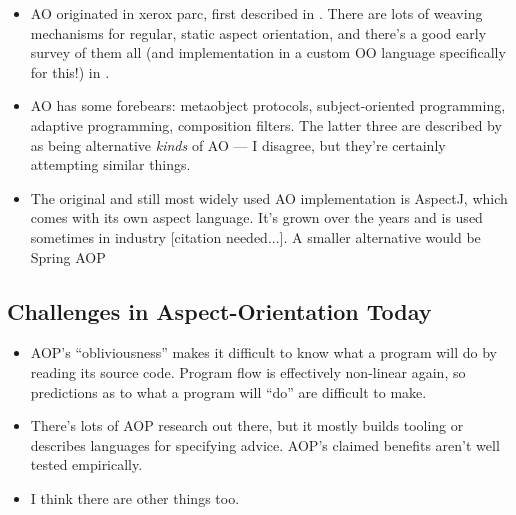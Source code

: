 \begin{itemize}
    \item AO originated in xerox parc, first described in
    \cite{kiczales1997aspect}. There are lots of weaving mechanisms for regular,
    static aspect orientation, and there's a good early survey of them all (and
    implementation in a custom OO language specifically for this!) in
    \cite{masuhara2003modeling}.
    \item AO has some forebears: metaobject protocols, subject-oriented
    programming, adaptive programming, composition filters. The latter three are
    described by \cite{chibani2019using} as being alternative \emph{kinds} of AO
    --- I disagree, but they're certainly attempting similar things.
    \item The original and still most widely used AO implementation is AspectJ,
    which comes with its own aspect language. It's grown over the years and is
    used sometimes in industry [citation needed...]. A smaller alternative would
    be Spring AOP
\end{itemize}




\subsection{Challenges in Aspect-Orientation Today}



\begin{itemize}
  \item AOP's ``obliviousness'' makes it difficult to know what a program will
    do by reading its source code. Program flow is effectively non-linear again,
    so predictions as to what a program will ``do'' are difficult to make.
  \item There's lots of AOP research out there, but it mostly builds tooling or
    describes languages for specifying advice. AOP's claimed benefits aren't
    well tested empirically.
  \item I think there are other things too. 
\end{itemize}






